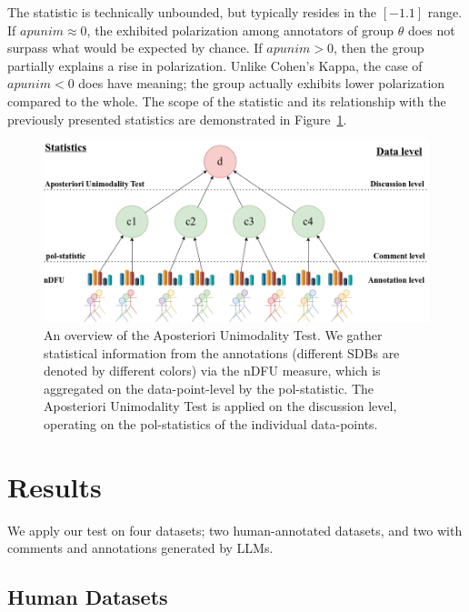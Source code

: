 \documentclass{article}
\begin{document}
The statistic is technically unbounded, but typically resides in the $[-1. 1]$ range. If $apunim \approx 0$, the exhibited polarization among annotators of group $\theta$ does not surpass what would be expected by chance. If $apunim > 0$, then the group partially explains a rise in polarization. Unlike Cohen's Kappa, the case of $apunim < 0$ does have meaning; the group actually exhibits lower polarization compared to the whole. The scope of the statistic and its relationship with the previously presented statistics are demonstrated in Figure~\ref{fig::overview}. 

\begin{figure}
	\includegraphics[width=\linewidth]{overview.png}
	\caption{An overview of the Aposteriori Unimodality Test. We gather statistical information from the annotations (different \acp{SDB} are denoted by different colors) via the \ac{nDFU} measure, which is aggregated on the data-point-level by the pol-statistic. The Aposteriori Unimodality Test is applied on the discussion level, operating on the pol-statistics of the individual data-points.}
	\label{fig::overview}
\end{figure}


\section{Results}
\label{sec:results}

We apply our test on four datasets; two human-annotated datasets, and two with comments and annotations generated by \acp{LLM}.

\subsection{Human Datasets}
\end{document}
